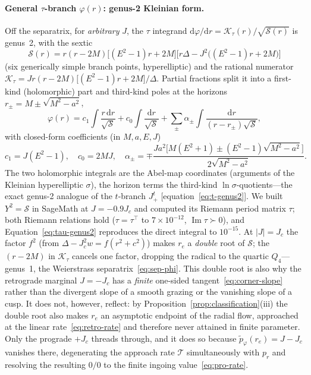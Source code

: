 \documentclass[12pt]{iopart}
\theoremstyle{plain}
\theoremstyle{definition}
\theoremstyle{remark}
\newcommand{\re}{r_{e}}
\newcommand{\Jc}{J_{c}}
\newcommand{\dd}{\mathrm{d}}
\begin{document}
\paragraph{General $\tau$-branch $\varphi(r)$: genus-2 Kleinian form.} Off the
separatrix, for \emph{arbitrary} $J$, the $\tau$ integrand
$\dd\varphi/\dd r=\mathcal K_\tau(r)/\sqrt{\mathcal S(r)}$ is genus~2, with the
sextic
\begin{equation}
    \mathcal S(r)=r(r-2M)\big[(E^2-1)r+2M\big]
      \big[r\Delta-J^2\big((E^2-1)r+2M\big)\big]
    \label{eq:tau-sextic}
\end{equation}
(six generically simple branch points, hyperelliptic) and the rational numerator
$\mathcal K_\tau=Jr(r-2M)\big[(E^2-1)r+2M\big]/\Delta$. Partial fractions split it
into a first-kind (holomorphic) part and third-kind poles at the horizons
$r_\pm=M\pm\sqrt{M^2-a^2}$,
\begin{equation}
    \varphi(r)=c_1\!\int\!\frac{r\,\dd r}{\sqrt{\mathcal S}}
      +c_0\!\int\!\frac{\dd r}{\sqrt{\mathcal S}}
      +\sum_{\pm}\alpha_\pm\!\int\!\frac{\dd r}{(r-r_\pm)\sqrt{\mathcal S}},
    \label{eq:tau-genus2}
\end{equation}
with closed-form coefficients (in $M,a,E,J$)
\begin{equation}
    c_1=J(E^2-1),\quad c_0=2MJ,\quad
    \alpha_\pm=\mp\frac{Ja^2\big[M(E^2+1)\pm(E^2-1)\sqrt{M^2-a^2}\big]}
      {2\sqrt{M^2-a^2}}.
    \label{eq:tau-coeffs}
\end{equation}
The two holomorphic integrals are the Abel-map coordinates (arguments of the
Kleinian hyperelliptic $\sigma$), the horizon terms the third-kind
$\ln\sigma$-quotients---the exact genus-2 analogue of the $t$-branch $J_+^t$
[equation~\eqref{eq:t-genus2}]. We built $Y^2=\mathcal S$ in SageMath at $J=-0.9\Jc$
and computed its Riemann period matrix $\tau$; both Riemann relations hold
($\tau=\tau^\top$ to $7\times10^{-12}$, $\operatorname{Im}\tau\succ0$), and
Equation~\eqref{eq:tau-genus2} reproduces the direct integral to $10^{-15}$. At
$|J|=\Jc$ the factor $f^2$ (from $\Delta-\Jc^2w=f(r^2+c^2)$) makes $r_e$ a
\emph{double} root of $\mathcal S$; the $(r-2M)$ in $\mathcal K_\tau$ cancels one
factor, dropping the radical to the quartic $Q_4$---genus~1, the Weierstrass
separatrix~\eqref{eq:sep-phi}. This double root is also why the retrograde
marginal $J=-\Jc$ has a \emph{finite} one-sided tangent~\eqref{eq:corner-slope}
rather than the divergent slope of a smooth grazing or the vanishing slope of a
cusp. It does not, however, reflect: by
Proposition~\ref{prop:classification}(iii) the double root also makes $\re$ an
asymptotic endpoint of the radial flow, approached at the linear
rate~\eqref{eq:retro-rate} and therefore never attained in finite parameter. Only
the prograde $+\Jc$ threads through, and it does so because
$\tilde p_\varphi(\re)=J-\Jc$ vanishes there, degenerating the approach rate
$\mathcal T$ simultaneously with $p_r$ and resolving the resulting $0/0$ to the
finite ingoing value~\eqref{eq:pro-rate}.
\end{document}
